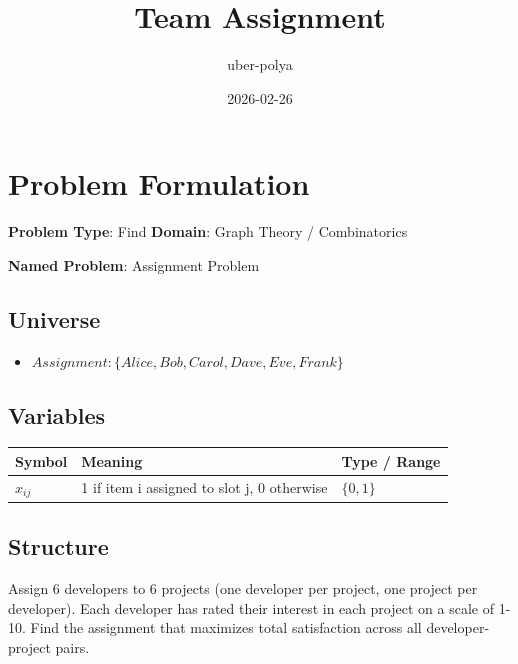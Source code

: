 \documentclass[11pt, a4paper]{article}
\title{Team Assignment}
\author{uber-polya}
\date{2026-02-26}
\begin{document}
\maketitle
\tableofcontents
\newpage

\section{Problem Formulation}

\begin{polyamodel}

\textbf{Problem Type}: Find \hfill
\textbf{Domain}: Graph Theory / Combinatorics

\textbf{Named Problem}: Assignment Problem

\end{polyamodel}

\subsection{Universe}

\begin{itemize}
  \item $Assignment: \{Alice, Bob, Carol, Dave, Eve, Frank\}$
\end{itemize}

\subsection{Variables}

\begin{longtable}{lll}
\toprule
\textbf{Symbol} & \textbf{Meaning} & \textbf{Type / Range} \\
\midrule
\endhead
$x_{ij}$ & 1 if item i assigned to slot j, 0 otherwise & $\{0, 1\}$ \\
\bottomrule
\end{longtable}

\subsection{Structure}

Assign 6 developers to 6 projects (one developer per project, one project per developer). Each developer has rated their interest in each project on a scale of 1-10. Find the assignment that maximizes total satisfaction across all developer-project pairs.
\end{document}
